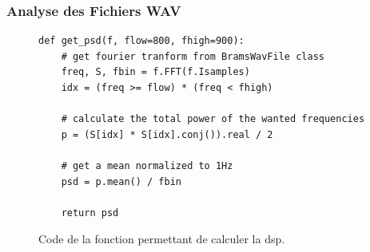 \documentclass[11pt]{article}
\begin{document}
\subsubsection{Analyse des Fichiers WAV}

\begin{figure}
    \begin{lstlisting}[style=CStyle]
def get_psd(f, flow=800, fhigh=900):
    # get fourier tranform from BramsWavFile class
    freq, S, fbin = f.FFT(f.Isamples)
    idx = (freq >= flow) * (freq < fhigh)

    # calculate the total power of the wanted frequencies
    p = (S[idx] * S[idx].conj()).real / 2

    # get a mean normalized to 1Hz
    psd = p.mean() / fbin

    return psd
    \end{lstlisting}
    \caption{Code de la fonction permettant de calculer la dsp.}
    \label{fig:psd-code}
\end{figure}
\end{document}
